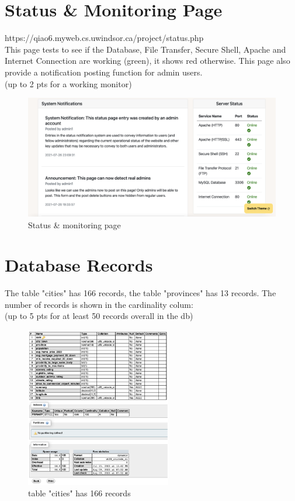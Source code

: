\documentclass[12pt, letterpaper]{article}
\begin{document}
 \newpage

\section{Status \& Monitoring Page}
https://qiao6.myweb.cs.uwindsor.ca/project/status.php
\\This page tests to see if the Database, File Transfer, Secure Shell, Apache and Internet Connection are working (green), it shows red otherwise. This page also provide a notification posting function for admin users.
\\(up to 2 pts for a working monitor)

\begin{figure}[htbp]
	\centering
	\includegraphics[width=5in]{images/q19.png}
	\caption{Status \& monitoring page}
 \end{figure}

 \newpage

\section{Database Records}
The table "cities" has 166 records, the table "provinces" has 13 records. 
The number of records is shown in the cardinality colum:
\\(up to 5 pts for at least 50 records overall in the db)

\begin{figure}[htbp]
	\centering
	\includegraphics[width=2.5in]{images/q20-1.png}
	\caption{table "cities" has 166 records}
 \end{figure}
\end{document}
